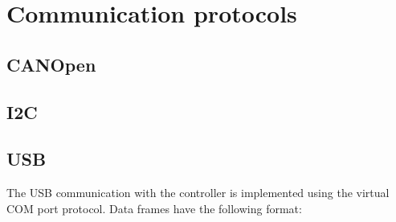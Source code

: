 \section{Communication protocols}
\label{sec:comm_protocols}
\subsection{CANOpen}
\subsection{I2C}
\subsection{USB}
The USB communication with the controller is implemented using the virtual COM port protocol.
Data frames have the following format:
